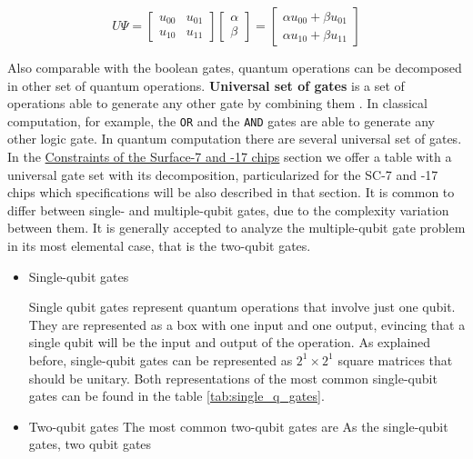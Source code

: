 \begin{itemize}
\begin{equation}
\label{eq:orgb64a917}
U \Psi=\begin{bmatrix}u_{00}&u_{01}\\u_{10}&u_{11}\end{bmatrix} \begin{bmatrix}\alpha \\ \beta \end{bmatrix} = \begin{bmatrix}\alpha u_{00} + \beta u_{01} \\ \alpha u_{10} + \beta u_{11} \end{bmatrix}
\end{equation}

Also comparable with the boolean gates, quantum operations can be decomposed in other set of quantum operations.
\textbf{Universal set of gates} is a set of operations able to generate any other gate by combining them \cite{Nielsen_2009}.
In classical computation, for example, the \texttt{OR} and the \texttt{AND} gates are able to generate any other logic gate.
In quantum computation there are several universal set of gates.
In the \href{chapter-3.org}{Constraints of the Surface-7 and -17 chips} section we offer a table with a universal gate set with its decomposition, particularized for the SC-7 and -17 chips which specifications will be also described in that section.
It is common to differ between single- and multiple-qubit gates, due to the complexity variation between them.
It is generally accepted to analyze the multiple-qubit gate problem in its most elemental case, that is the two-qubit gates.

\begin{itemize}
\item Single-qubit gates
\label{sec:org91dd213}

Single qubit gates represent quantum operations that involve just one qubit.
They are represented as a box with one input and one output, evincing that a single qubit will be the input and output of the operation.
As explained before, single-qubit gates can be represented as \(2^1 \times 2^1\) square matrices that should be unitary.
Both representations of the most common single-qubit gates can be found in the table \ref{tab:single_q_gates}.

\item Two-qubit gates
\label{sec:orgf906095}
The most common two-qubit gates are 
As the single-qubit gates, two qubit gates
\end{itemize}
\end{itemize}


